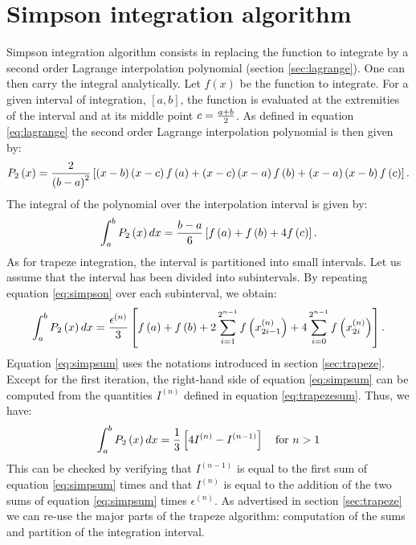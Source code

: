 \section{Simpson integration algorithm}

Simpson integration algorithm consists in replacing the function to integrate by a second order Lagrange interpolation polynomial\cite{Bass} (\cf section
\ref{sec:lagrange}). One can then carry the integral analytically.
Let $f\left(x\right)$ be the function to integrate. For a given
interval of integration, $\left[a,b\right]$, the function is
evaluated at the extremities of the interval and at its middle
point $c={a+b \over 2}$. As defined in equation \ref{eq:lagrange}
the second order Lagrange interpolation polynomial is then given
by:
\begin{equation}
  P_2\left(x\right)={2\over \left(b-a\right)^2}\left[\left(x-b\right)\left(x-c\right)f\left(a\right) +\left(x-c\right)\left(x-a\right)f\left(b\right) +
  \left(x-a\right)\left(x-b\right)f\left(c\right)\right].
\end{equation}
The integral of the polynomial over the interpolation interval is
given by:
\begin{equation}
\label{eq:simpson} \int_a^b P_2\left(x\right)dx={b-a \over
6}\left[f\left(a\right) + f\left(b\right) + 4 f\left(c\right)
\right].
\end{equation}
As for trapeze integration, the interval is partitioned into small
intervals. Let us assume that the interval has been divided into
subintervals. By repeating equation \ref{eq:simpson} over each
subinterval, we obtain:
\begin{equation}
\label{eq:simpsum} \int_a^b
P_2\left(x\right)dx={\epsilon^{\left(n\right)} \over
3}\left[f\left(a\right) + f\left(b\right) + 2 \sum_{i=1}^{2^{n-1}}
f\left(x_{2i-1}^{\left(n\right)}\right) + 4 \sum_{i=0}^{2^{n-1}}
f\left(x_{2i}^{\left(n\right)}\right) \right].
\end{equation}
Equation \ref{eq:simpsum} uses the notations introduced in section
\ref{sec:trapeze}. Except for the first iteration, the right-hand
side of equation \ref{eq:simpsum} can be computed from the
quantities $I^{\left(n\right)}$ defined in equation
\ref{eq:trapezesum}. Thus, we have:
\begin{equation}
  \int_a^b
P_2\left(x\right)dx={1 \over
3}\left[4I^{\left(n\right)}-I^{\left(n-1\right)}\right]
\mbox{\quad for $n>1$}
\end{equation}
This can be checked by verifying that $I^{\left(n-1\right)}$ is
equal to the first sum of equation \ref{eq:simpsum} times  and
that $I^{\left(n\right)}$  is equal to the addition of the two
sums of equation \ref{eq:simpsum} times
$\epsilon^{\left(n\right)}$. As advertised in section
\ref{sec:trapeze} we can re-use the major parts of the trapeze
algorithm: computation of the sums and partition of the
integration interval.

